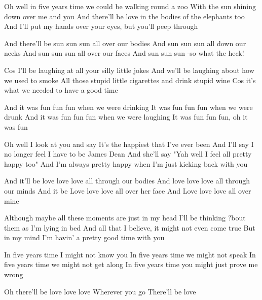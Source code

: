 Oh well in five years time we could be walking round a zoo
With the sun shining down over me and you
And there'll be love in the bodies of the elephants too
And I'll put my hands over your eyes, but you'll peep through

And there'll be sun sun sun all over our bodies
And sun sun sun all down our necks
And sun sun sun all over our faces
And sun sun sun -so what the heck!

Cos I'll be laughing at all your silly little jokes
And we'll be laughing about how we used to smoke
All those stupid little cigarettes and drink stupid wine
Cos it's what we needed to have a good time

And it was fun fun fun when we were drinking
It was fun fun fun when we were drunk
And it was fun fun fun when we were laughing
It was fun fun fun, oh it was fun

Oh well I look at you and say
It's the happiest that I've ever been
And I'll say I no longer feel I have to be James Dean
And she'll say
"Yah well I feel all pretty happy too"
And I'm always pretty happy when I'm just kicking back with you

And it'll be love love love all through our bodies
And love love love all through our minds
And it be Love love love all over her face
And Love love love all over mine

Although maybe all these moments are just in my head
I'll be thinking ?bout them as I'm lying in bed
And all that I believe, it might not even come true
But in my mind I'm havin' a pretty good time with you


In five years time I might not know you
In five years time we might not speak
In five years time we might not get along
In five years time you might just prove me wrong

Oh there'll be love love love
Wherever you go
There'll be love